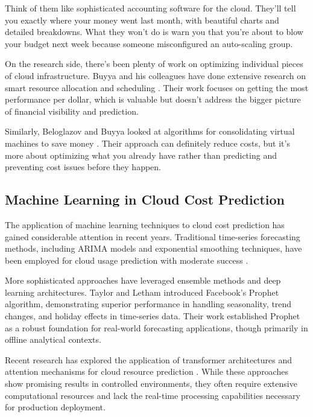 \documentclass[conference]{IEEEtran}
\begin{document}
Think of them like sophisticated accounting software for the cloud. They'll tell you exactly where your money went last month, with beautiful charts and detailed breakdowns. What they won't do is warn you that you're about to blow your budget next week because someone misconfigured an auto-scaling group.

On the research side, there's been plenty of work on optimizing individual pieces of cloud infrastructure. Buyya and his colleagues have done extensive research on smart resource allocation and scheduling \cite{buyya2020resource}. Their work focuses on getting the most performance per dollar, which is valuable but doesn't address the bigger picture of financial visibility and prediction.

Similarly, Beloglazov and Buyya looked at algorithms for consolidating virtual machines to save money \cite{beloglazov2012optimal}. Their approach can definitely reduce costs, but it's more about optimizing what you already have rather than predicting and preventing cost issues before they happen.

\subsection{Machine Learning in Cloud Cost Prediction}

The application of machine learning techniques to cloud cost prediction has gained considerable attention in recent years. Traditional time-series forecasting methods, including ARIMA models and exponential smoothing techniques, have been employed for cloud usage prediction with moderate success \cite{chen2019cloud}.

More sophisticated approaches have leveraged ensemble methods and deep learning architectures. Taylor and Letham \cite{taylor2018forecasting} introduced Facebook's Prophet algorithm, demonstrating superior performance in handling seasonality, trend changes, and holiday effects in time-series data. Their work established Prophet as a robust foundation for real-world forecasting applications, though primarily in offline analytical contexts.

Recent research has explored the application of transformer architectures and attention mechanisms for cloud resource prediction \cite{wang2022attention}. While these approaches show promising results in controlled environments, they often require extensive computational resources and lack the real-time processing capabilities necessary for production deployment.
\end{document}
